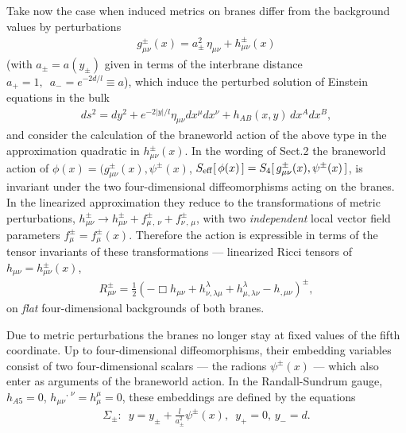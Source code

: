 \documentclass[a4paper,12pt]{article}
\begin{document}
Take now the case when induced metrics on branes
differ from the background values by perturbations
    \begin{eqnarray}
    g^\pm_{\mu\nu}(x)=
    a^2_\pm\,\eta_{\mu\nu}+h^\pm_{\mu\nu}(x)  \label{1.4}
    \end{eqnarray}
(with $a_\pm=a(y_\pm)$ given in terms of the interbrane
distance $a_+=1,\,\,\,a_-=e^{-2d/l}\equiv a$), which induce
the perturbed solution of Einstein equations in the bulk
     \begin{eqnarray}
     ds^2=dy^2+e^{-2|y|/l}\eta_{\mu\nu}dx^\mu dx^\nu
     +h_{AB}(x,y)\,dx^Adx^B,                        \label{1.3}
     \end{eqnarray}
and consider the calculation of the braneworld action of the above
type in the approximation quadratic in $h^\pm_{\mu\nu}(x)$. In the
wording of Sect.2 the braneworld action of
$\phi(x)=(g_{\mu\nu}^\pm(x),\psi^\pm(x)$,
$S_{\rm eff}[\,\phi(x)\,]=S_4[\,g_{\mu\nu}^\pm(x),\psi^\pm(x)\,]$, is
invariant under the two four-dimensional diffeomorphisms
acting on the branes. In the linearized approximation they reduce
to the transformations of metric perturbations,
   $h^\pm_{\mu\nu}\rightarrow h^\pm_{\mu\nu}
   +f^\pm_{\mu\,,\,\nu}+f^\pm_{\nu\,,\,\mu}$,
with two {\em independent} local vector field parameters
$f_\mu^\pm=f_\mu^\pm(x)$. Therefore the action is expressible in
terms of the tensor invariants of these transformations ---
linearized Ricci tensors of $h_{\mu\nu}=h^\pm_{\mu\nu}(x)$,
  \begin{eqnarray}
  R^\pm_{\mu\nu}=\frac12\left(-\Box h_{\mu\nu}
  +h^\lambda_{\nu,\lambda\mu}
  +h^\lambda_{\mu,\lambda\nu}-h_{,\mu\nu}\right)^\pm,  \label{1.8}
  \end{eqnarray}
on {\em flat} four-dimensional backgrounds of both branes.

Due to metric perturbations the branes no longer stay at fixed
values of the fifth coordinate. Up to four-dimensional
diffeomorphisms, their embedding variables consist of
two four-dimensional scalars --- the radions $\psi^\pm(x)$ ---
which also enter as arguments of the braneworld action.
In the Randall-Sundrum gauge, $h_{A5}=0$,
${h_{\mu\nu}}^{,\,\nu}=h_\mu^\mu=0$, these embeddings are
defined by the equations
   \begin{eqnarray}
   \Sigma_\pm:\,\,\,
   y=y_\pm+\frac l{a^2_\pm}\psi^\pm(x),\,\,\,
   y_+=0,\,y_-=d.                          \label{1.11}
   \end{eqnarray}
\end{document}
